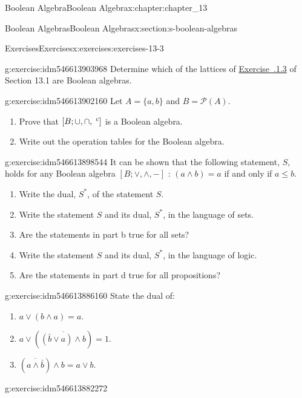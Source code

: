 \documentclass[oneside,10pt,]{book}
\newcommand{\xreffont}{\relax}
\numberwithin{equation}{section}
\begin{document}
\begin{chapterptx}{Boolean Algebra}{}{Boolean Algebra}{}{}{x:chapter:chapter_13}
\begin{sectionptx}{Boolean Algebras}{}{Boolean Algebras}{}{}{x:section:s-boolean-algebras}
\begin{exercises-subsection}{Exercises}{}{Exercises}{}{}{x:exercises:exercises-13-3}
\begin{divisionexercise}{3}{}{}{g:exercise:idm546613903968}%
Determine which of the lattices of \hyperlink{x:exercise:exercise-13-1-3}{Exercise~{\xreffont 13.1.1.3}} of Section 13.1 are Boolean algebras.%
\end{divisionexercise}%
\begin{divisionexercise}{4}{}{}{g:exercise:idm546613902160}%
Let \(A = \{a, b\}\) and \(B = \mathcal{P}(A)\).%
\begin{enumerate}[label=(\alph*)]
\item{}Prove that \([B; \cup, \cap, \hspace{1 mm}^c ]\) is a Boolean algebra.%
\item{}Write out the operation tables for the Boolean algebra.%
\end{enumerate}
%
\end{divisionexercise}%
\begin{divisionexercise}{5}{}{}{g:exercise:idm546613898544}%
It can be shown that the following statement, \(S\), holds for any Boolean algebra \([B; \lor , \land, -]\) : \((a \land  b) = a\) if and only if \(a \leq  b\).%
\begin{enumerate}[label=(\alph*)]
\item{}Write the dual, \(S^*\), of the statement \(S\).%
\item{}Write the statement \(S\) and its dual, \(S^*\), in the language of sets.%
\item{}Are the statements in part b true for all sets?%
\item{}Write the statement \(S\) and its dual, \(S^*\), in the language of logic.%
\item{}Are the statements in part d true for all propositions?%
\end{enumerate}
%
\end{divisionexercise}%
\begin{divisionexercise}{6}{}{}{g:exercise:idm546613886160}%
State the dual of:%
\begin{enumerate}[label=(\alph*)]
\item{}\(a \lor  (b \land  a) = a\).%
\item{}\(a \lor  \left(\overline{\left(\bar{b} \lor  a\right) \land  b}\right) = 1\).%
\item{}\(\left(\overline{a \land  \bar{b}}\right) \land  b = a\lor  b\).%
\end{enumerate}
%
\end{divisionexercise}%
\begin{divisionexercise}{7}{}{}{g:exercise:idm546613882272}%

\end{divisionexercise}
\end{exercises-subsection}
\end{sectionptx}
\end{chapterptx}
\end{document}
